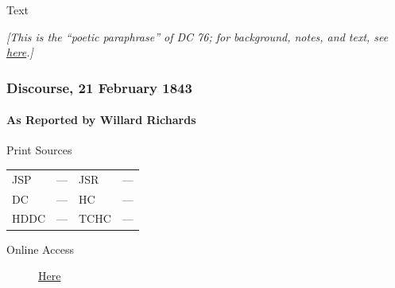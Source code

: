 			
			\begin{description}
				\item[Text]
			\end{description}
			
				\textit{[This is the ``poetic paraphrase'' of DC 76; for background, notes, and text, see \hyperref[EXSS-DC76-POETIC]{here}.]}
				
		\subsubsection{Discourse, 21 February 1843}
			\label{EMS-1843-JS-21-FEB-1843}
			
			\paragraph{As Reported by Willard Richards}
				\label{EMS-1843-JS-21-FEB-1843-WR}
			
				\begin{description}
					\item[Print Sources]
				\end{description}

					\begin{tabular}{p{0.5in}p{1in}p{0.5in}p{1in}}
					JSP	 	& ---		& JSR 		& --- \\
					DC	 	& ---		& HC 		& --- \\
					HDDC 	& ---		& TCHC 		& --- \\
					\end{tabular}
				
				\begin{description}
					\item[Online Access] \href{https://www.josephsmithpapers.org/paper-summary/discourse-21-february-1843-as-reported-by-willard-richards/1}{Here}
				\end{description}
				
